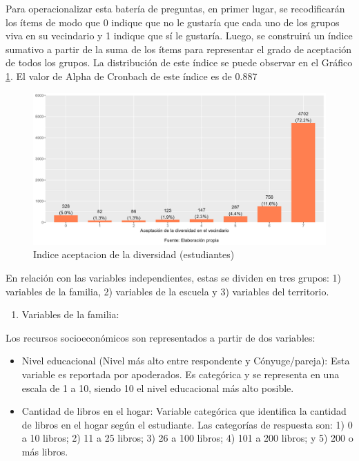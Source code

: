 \documentclass[12pt,twoside]{templates/facsothesis}
\providecommand{\tightlist}{%
  \setlength{\itemsep}{0pt}\setlength{\parskip}{0pt}}
\begin{document}
Para operacionalizar esta batería de preguntas, en primer lugar, se recodificarán los ítems de modo que 0 indique que no le gustaría que cada uno de los grupos viva en su vecindario y 1 indique que sí le gustaría. Luego, se construirá un índice sumativo a partir de la suma de los ítems para representar el grado de aceptación de todos los grupos. La distribución de este índice se puede observar en el Gráfico \ref{fig:ind-est}. El valor de Alpha de Cronbach de este índice es de 0.887

\begin{figure}[!ht]

{\centering \includegraphics[width=0.8\linewidth,]{IPO/output/graphs/ind_est} 

}

\caption{Indice aceptacion de la diversidad (estudiantes)}\label{fig:ind-est}
\end{figure}

En relación con las variables independientes, estas se dividen en tres grupos: 1) variables de la familia, 2) variables de la escuela y 3) variables del territorio.

\begin{enumerate}
\def\labelenumi{\arabic{enumi})}
\tightlist
\item
  Variables de la familia:
\end{enumerate}

Los recursos socioeconómicos son representados a partir de dos variables:

\begin{itemize}
\item
  Nivel educacional (Nivel más alto entre respondente y Cónyuge/pareja): Esta variable es reportada por apoderados. Es categórica y se representa en una escala de 1 a 10, siendo 10 el nivel educacional más alto posible.
\item
  Cantidad de libros en el hogar: Variable categórica que identifica la cantidad de libros en el hogar según el estudiante. Las categorías de respuesta son: 1) 0 a 10 libros; 2) 11 a 25 libros; 3) 26 a 100 libros; 4) 101 a 200 libros; y 5) 200 o más libros.
\end{itemize}
\end{document}
